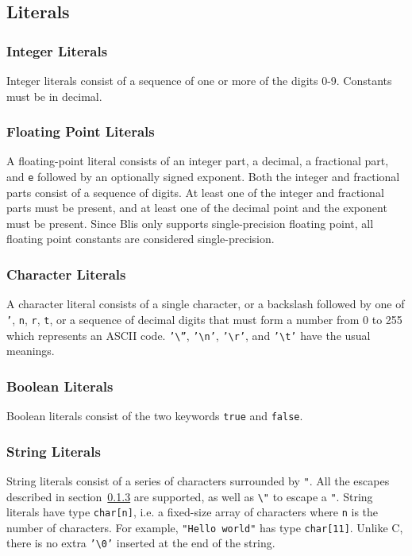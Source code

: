 \documentclass[11pt]{article}
\newcommand{\code}[1]{\texttt{#1}}
\begin{document}
\subsection{Literals}

\subsubsection{Integer Literals}

Integer literals consist of a sequence of one or more of the digits 0-9. Constants must be in decimal.

\subsubsection{Floating Point Literals}

A floating-point literal consists of an integer part, a decimal, a fractional part, and \code{e} followed by an optionally signed exponent. Both the integer and fractional parts consist of a sequence of digits. At least one of the integer and fractional parts must be present, and at least one of the decimal point and the exponent must be present. Since Blis only supports single-precision floating point, all floating point constants are considered single-precision.

\subsubsection{Character Literals} \label{charliterals}

A character literal consists of a single character, or a backslash followed by one of \code{'}, \code{n}, \code{r}, \code{t}, or a sequence of decimal digits that must form a number from 0 to 255 which represents an ASCII code. \code{'\textbackslash''}, \code{'\textbackslash{}n'}, \code{'\textbackslash{}r'}, and \code{'\textbackslash{}t'} have the usual meanings.

\subsubsection{Boolean Literals}

Boolean literals consist of the two keywords \code{true} and \code{false}.

\subsubsection{String Literals}

String literals consist of a series of characters surrounded by \code{"}. All the escapes described in section~\ref{charliterals} are supported, as well as \code{\textbackslash{}"} to escape a \code{"}. String literals have type \code{char[n]}, i.e. a fixed-size array of characters where \code{n} is the number of characters. For example, \code{"Hello world"} has type \code{char[11]}. Unlike C, there is no extra \code{'\textbackslash{}0'} inserted at the end of the string.
\end{document}

